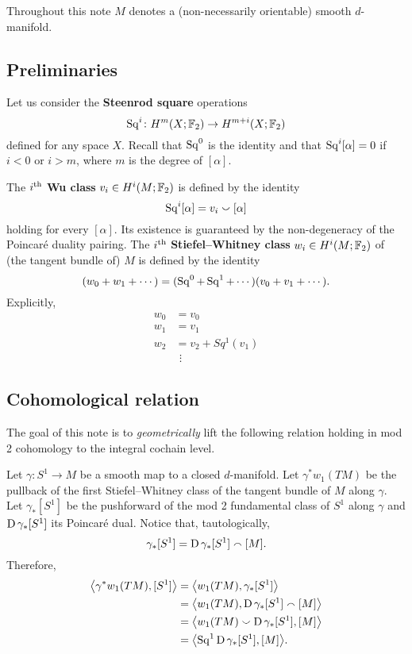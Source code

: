 

Throughout this note $M$ denotes a (non-necessarily orientable) smooth $d$-manifold.

\subsection*{Preliminaries}

Let us consider the \textbf{Steenrod square} operations
\[
\Sq^i \colon H^m(X; \Ftwo) \to H^{m+i}(X; \Ftwo)
\]
defined for any space $X$.
Recall that $\Sq^0$ is the identity and that $\Sq^i[\alpha] = 0$ if $i < 0$ or $i > m$, where $m$ is the degree of $[\alpha]$.

The $i^\th$ \textbf{Wu class} $v_i \in H^i(M; \Ftwo)$ is defined by the identity
\[
\Sq^i [\alpha] = v_i \smallsmile [\alpha]
\]
holding for every $[\alpha]$.
Its existence is guaranteed by the non-degeneracy of the Poincar\'e duality pairing.
The $i^\th$ \textbf{Stiefel--Whitney class} $w_i \in H^i(M; \Ftwo)$ of (the tangent bundle of) $M$ is defined by the identity
\[
(w_0 + w_1 + \dotsb) = (\Sq^0 + \Sq^1 + \dotsb)(v_0 + v_1 + \dotsb).
\]
Explicitly,
\begin{align*}
	w_0 &= v_0 \\
	w_1 &= v_1 \\
	w_2 &= v_2 + Sq^1(v_1) \\
	& \ \, \vdots
\end{align*}

\subsection*{Cohomological relation}

The goal of this note is to \emph{geometrically} lift the following relation holding in mod 2 cohomology to the integral cochain level.

Let $\gamma \colon S^1 \to M$ be a smooth map to a closed $d$-manifold.
Let $\gamma^\ast w_1(TM)$ be the pullback of the first Stiefel--Whitney class of the tangent bundle of $M$ along $\gamma$.
Let $\gamma_\ast[S^1]$ be the pushforward of the mod 2 fundamental class of $S^1$ along $\gamma$ and $\dual \gamma_\ast[S^1]$ its Poincar\'e dual.
Notice that, tautologically,
\[
\gamma_\ast[S^1] = \dual \gamma_\ast[S^1] \smallfrown [M].
\]
Therefore,
\begin{equation} \label{e:cohomological_relation}
	\begin{split}
	\angles[\big]{\gamma^\ast w_1(TM), [S^1]} &=
	\angles[\big]{w_1(TM), \gamma_\ast [S^1]} \\ &=
	\angles[\big]{w_1(TM), \dual \gamma_\ast[S^1] \smallfrown [M]} \\ &=
	\angles[\big]{w_1(TM) \smallsmile \dual \gamma_\ast[S^1], [M]} \\ &=
	\angles[\big]{\Sq^1 \dual \gamma_\ast[S^1], [M]}.
	\end{split}
\end{equation}

